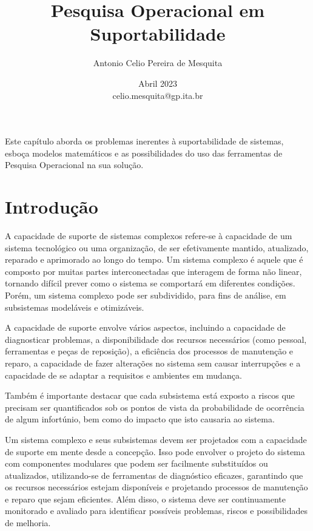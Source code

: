 \documentclass{amsart}
\begin{document}
		
	\title{Pesquisa Operacional em Suportabilidade}
	\author{Antonio Celio Pereira de Mesquita}
	\date{ Abril 2023 \\ celio.mesquita@gp.ita.br}
	

\maketitle


	Este capítulo aborda os problemas inerentes à suportabilidade de sistemas, esboça modelos matemáticos e as possibilidades do uso das ferramentas de Pesquisa Operacional na sua solução.
	

\section{Introdução}

A capacidade de suporte de sistemas complexos refere-se à capacidade de um sistema tecnológico ou uma organização, de ser efetivamente mantido, atualizado, reparado e aprimorado ao longo do tempo. Um sistema complexo é aquele que é composto por muitas partes interconectadas que interagem de forma não linear, tornando difícil prever como o sistema se comportará em diferentes condições. Porém, um sistema complexo pode ser subdividido, para fins de análise, em subsistemas modeláveis e otimizáveis.

A capacidade de suporte envolve vários aspectos, incluindo a capacidade de diagnosticar problemas, a disponibilidade dos recursos necessários (como pessoal, ferramentas e peças de reposição), a eficiência dos processos de manutenção e reparo, a capacidade de fazer alterações no sistema sem causar interrupções e a capacidade de se adaptar a requisitos e ambientes em mudança.

Também é importante destacar que cada subsistema está exposto a riscos que precisam ser quantificados sob os pontos de vista da probabilidade de ocorrência de algum infortúnio, bem como do impacto que isto causaria ao sistema.

Um sistema complexo e seus subsistemas devem ser projetados com a capacidade de suporte em mente desde a concepção. Isso pode envolver o projeto do sistema com componentes modulares que podem ser facilmente substituídos ou atualizados, utilizando-se de ferramentas de diagnóstico eficazes, garantindo que os recursos necessários estejam disponíveis e projetando processos de manutenção e reparo que sejam eficientes. Além disso, o sistema deve ser continuamente monitorado e avaliado para identificar possíveis problemas, riscos e possibilidades de melhoria.
\end{document}
